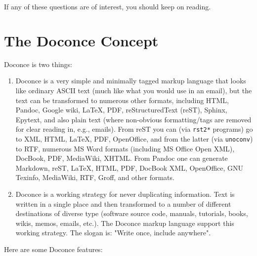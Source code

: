 \documentclass[%
oneside,                 %
final,                   %
10pt]{article}
\begin{document}
\noindent
If any of these questions are of interest, you should keep on reading.


\section{The Doconce Concept}

Doconce is two things:

\begin{enumerate}
 \item Doconce is a very simple and minimally tagged markup language that
    looks like ordinary ASCII text (much like what you would use in an
    email), but the text can be transformed to numerous other formats,
    including HTML, Pandoc, Google wiki, {\LaTeX}, PDF, reStructuredText
    (reST), Sphinx, Epytext, and also plain text (where non-obvious
    formatting/tags are removed for clear reading in, e.g.,
    emails). From reST you can (via {\fontsize{10pt}{10pt}\Verb!rst2*!} programs) go to XML, HTML,
    {\LaTeX}, PDF, OpenOffice, and from the latter (via {\fontsize{10pt}{10pt}\Verb!unoconv!}) to
    RTF, numerous MS Word formats (including MS Office Open XML),
    DocBook, PDF, MediaWiki, XHTML. From Pandoc one can generate
    Markdown, reST, {\LaTeX}, HTML, PDF, DocBook XML, OpenOffice, GNU
    Texinfo, MediaWiki, RTF, Groff, and other formats.

 \item Doconce is a working strategy for never duplicating information.
    Text is written in a single place and then transformed to
    a number of different destinations of diverse type (software
    source code, manuals, tutorials, books, wikis, memos, emails, etc.).
    The Doconce markup language support this working strategy.
    The slogan is: "Write once, include anywhere".
\end{enumerate}

\noindent
Here are some Doconce features:
\end{document}
